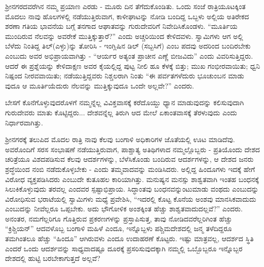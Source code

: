 ಶ‍್ರೀನಗರದವರೆಗಿನ ನಮ್ಮ ಪ್ರಯಾಣ ಎರಡು - ಮೂರು ದಿನ ತೆಗೆದುಕೊಂಡಿತು. ಒಂದು ಸಂಜೆ ರಾತ್ರಿಯೂಟಕ್ಕಿಂತ ಮೊದಲು ನಾವು ಹೊಲಗಳಲ್ಲಿ ನಡೆಯುತ್ತಿರುವಾಗ, ಕಾಳೀಘಾಟನ್ನು ನೋಡಿ ಬಂದಿದ್ದ ಒಬ್ಬಳು ಅಲ್ಲಿಯ ಅತಿರೇಕದ ಶರಣಾ ಗತಿಯ ಭಾವನೆಯ ಬಗ್ಗೆ ತನಗಾದ ಆಘಾತವನ್ನು ಗುರುದೇವರಿಗೆ ನಿವೇದಿಸಿಕೊಂಡಳು. “ಮೂರ್ತಿಯ ಮುಂದಿರುವ ನೆಲವನ್ನು ಅವರೇಕೆ ಮುತ್ತಿಕ್ಕುತ್ತಾರೆ?” ಎಂದು ಅಚ್ಚರಿಯಿಂದ ಕೇಳಿದವಳು. ಸ್ವಾಮಿಗಳು ಆಗ ಅಲ್ಲಿ ಬೆಳೆದು ನಿಂತಿದ್ದ ತಿಲ್(ಎಳ್ಳು)ನ್ನು ತೋರಿಸಿ - ಇಂಗ್ಲಿಷಿನ ಡಿಲ್ (ಸಬ್ಬಸಿಗೆ) ಎಂಬ ಪದವು ಅದರಿಂದ ಬಂದಿರಬೇಕು ಎಂಬುದು ಅವರ ಅಭಿಪ್ರಾಯವಾಗಿತ್ತು - “ಆರ್ಯರ ಅತ್ಯಂತ ಪ್ರಾಚೀನ ಎಣ್ಣೆ ಬೀಜವಿದು” ಎಂದು ವಿವರಿಸುತ್ತಿದ್ದರು. ಆದರೆ ಈ ಪ್ರಶ್ನೆಯನ್ನು ಕೇಳಿದಾಕ್ಷಣ ಅವರ ಕೈಯಲ್ಲಿದ್ದ ಪುಟ್ಟ ನೀಲಿ ಹೂ ಕೆಳಕ್ಕೆ ಬಿತ್ತು; ಮುಖ ಗಂಭೀರವಾಯಿತು; ಧ್ವನಿ ನಿಷ್ಪಂದ ನೀರವವಾಯಿತು; ನಡೆಯುತ್ತಿದ್ದವರು ನಿಶ್ಚಲರಾಗಿ ನಿಂತು “ಈ ಪರ್ವತಗಳೆದುರು ಭೂಚುಂಬನ ಮಾಡು ವುದೂ ಆ ಮೂರ್ತಿಯೆದುರು ನೆಲವನ್ನು ಮುತ್ತಿಕ್ಕುವುದೂ ಒಂದೇ ಅಲ್ಲವೇ?” ಎಂದರು.

ಬೇಸಗೆ ಕೊನೆಗೊಳ್ಳುವುದರೊಳಗೆ ನಮ್ಮನ್ನೆಲ್ಲ ವಿವಿಕ್ತವಾಸಕ್ಕೆ ಕರೆದೊಯ್ದು ಧ್ಯಾನ ಮಾಡುವುದನ್ನು ಕಲಿಸುವುದಾಗಿ ಗುರುದೇವರು ಮಾತು ಕೊಟ್ಟಿದ್ದರು... ದೇಶವನ್ನೆಲ್ಲ ತಿರುಗಿ ಆದ ಮೇಲೆ ಏಕಾಂತವಾಸಕ್ಕೆ ತೆರಳುವುದು ಎಂದು ನಿರ್ಧಾರವಾಗಿತ್ತು.

ಶ‍್ರೀನಗರಕ್ಕೆ ತಲುಪಿದ ಮೊದಲ ರಾತ್ರಿ ನಾವು ಕೆಲವು ಬಂಗಾಳಿ ಅಧಿಕಾರಿಗಳ ಜೊತೆಯಲ್ಲಿ ಊಟ ಮಾಡಿದೆವು. ಅವರೊಂದಿಗೆ ಸರಸ ಸಂಭಾಷಣೆ ನಡೆಯುತ್ತಿರುವಾಗ, ಪಾಶ್ಚಾತ್ಯ ಅತಿಥಿಗಳಾದ ನಮ್ಮಲ್ಲೊಬ್ಬರು - ಪ್ರತಿಯೊಂದು ದೇಶದ ಚರಿತ್ರೆಯೂ ವಿಶದಪಡಿಸುವ ಕೆಲವು ಆದರ್ಶಗಳನ್ನು, ಬೆಳೆಸಿಕೊಂಡು ಬಂದಿರುವ ಆದರ್ಶಗಳನ್ನು, ಆ ದೇಶದ ಜನರು ಶ್ರದ್ಧೆಯಿಂದ ನಂಬಿ ನಡೆದುಕೊಳ್ಳಬೇಕು - ಎಂದು ತಮ್ಮವಾದವನ್ನು ಮಂಡಿಸಿದರು. ಅಲ್ಲಿದ್ದ ಹಿಂದೂಗಳು ಇದಕ್ಕೆ ಹೇಗೆ ವಿರೋಧ ವ್ಯಕ್ತಪಡಿಸಿದರು ಎಂಬುದೇ ಕುತೂಹಲ ಕಾರಿಯಾಗಿತ್ತು. ಮನುಷ್ಯನ ಮನಸ್ಸು ಶಾಶ್ವತವಾಗಿ ಇಂತಹ ಬಂಧನಕ್ಕೆ ಸಿಲುಕಿಕೊಳ್ಳುವುದು ತರವಲ್ಲ ಎಂದವರ ಸ್ಪಷ್ಟಾಭಿಪ್ರಾಯ. ಸಿದ್ಧಾಂತವು ಬಂಧನವನ್ನುಂಟುಮಾಡು ವಂಥದು ಎಂಬುದನ್ನು ವಿರೋಧಿಸುವ ಭರಾಟೆಯಲ್ಲಿ ಸ್ವಾಮಿಗಳು ಮಧ್ಯೆ ಪ್ರವೇಶಿಸಿ, “ಇದರಲ್ಲಿ ಕೊಟ್ಟ ಕೊನೆಯ ಅಂಶವು ಮಾನಸಿಕವಾದುದು ಎಂಬುದನ್ನು ನೀವೆಲ್ಲರೂ ಒಪ್ಪಬೇಕು. ಅದು ಭೌಗೋಳಿಕ ಅಂಶಕ್ಕಿಂತ ಹೆಚ್ಚು ಶಾಶ್ವತವಾದುದಲ್ಲವೆ?” ಎಂದರು. ಅನಂತರ, ನಮಗೆಲ್ಲರಿಗೂ ಗೊತ್ತಿರುವ ಪ್ರಕರಣಗಳನ್ನು ಪ್ರಸ್ತಾಪಿಸುತ್ತ, ತಾವು ನೋಡಿದವರೆಲ್ಲರಿಗಿಂತ ಹೆಚ್ಚು “ಕ್ರಿಶ್ಚಿಯನ್” ಆದವಳೊಬ್ಬ ಬಂಗಾಳಿ ಮಹಿಳೆ ಎಂದೂ, ಇನ್ನೊಬ್ಬಳು ಪಶ್ಚಿಮದೇಶದಲ್ಲಿ ಜನ್ಮ ತಳೆದಿದ್ದರೂ ತಮಗಿಂತಲೂ ಹೆಚ್ಚು “ಹಿಂದೂ” ಆಗಿರುವಳು ಎಂದೂ ಉದಾಹರಣೆ ಕೊಟ್ಟರು. ಇಷ್ಟು ಮಾತ್ರವಲ್ಲ, ಆದರ್ಶದ ಸ್ಥಿತಿ ಎಂದರೆ ಒಂದು ಆದರ್ಶವನ್ನು ಸಾಧ್ಯವಾದಷ್ಟೂ ದೂರಕ್ಕೆ ಪ್ರಸರಿಸುವುದಕ್ಕಾಗಿ ನಮ್ಮಲ್ಲಿ ಒಬ್ಬೊಬ್ಬರೂ ಇನ್ನೊಬ್ಬರ ದೇಶದಲ್ಲಿ ಹುಟ್ಟಿ ಬರಬೇಕಾಗುತ್ತದೆ ಅಲ್ಲವೆ?

